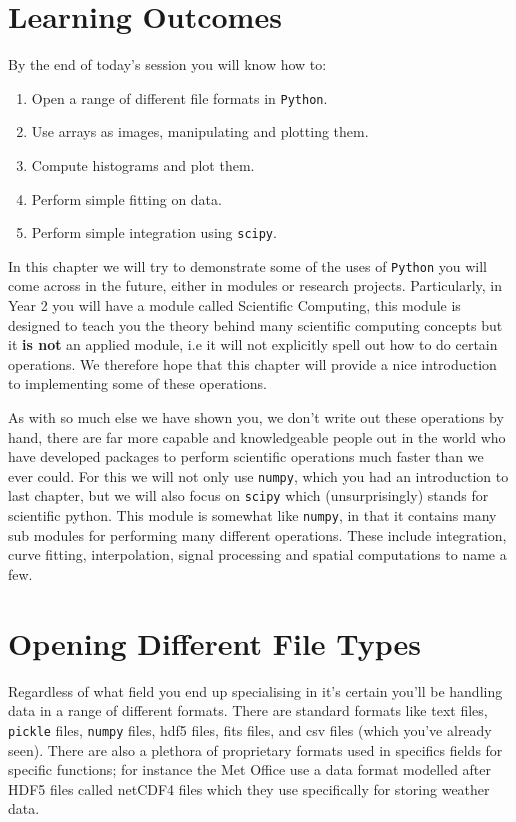 \section{Learning Outcomes}

\noindent By the end of today's session you will know how to:
\begin{enumerate} 
\item Open a range of different file formats in \texttt{Python}.
\item Use arrays as images, manipulating and plotting them.
\item Compute histograms and plot them.
\item Perform simple fitting on data.
\item Perform simple integration using \texttt{scipy}.
\end{enumerate}

In this chapter we will try to demonstrate some of the uses of \texttt{Python} you will come across in the future, either in modules or research projects. Particularly, in Year 2 you will have a module called Scientific Computing, this module is designed to teach you the theory behind many scientific computing concepts but it \textbf{is not} an applied module, i.e it will not explicitly spell out how to do certain operations. We therefore hope that this chapter will provide a nice introduction to implementing some of these operations. 

As with so much else we have shown you, we don't write out these operations by hand, there are far more capable and knowledgeable people out in the world who have developed packages to perform scientific operations much faster than we ever could. For this we will not only use \texttt{numpy}, which you had an introduction to last chapter, but we will also focus on \texttt{scipy} which (unsurprisingly) stands for scientific python. This module is somewhat like \texttt{numpy}, in that it contains many sub modules for performing many different operations. These include integration, curve fitting, interpolation, signal processing and spatial computations to name a few.

\section{Opening Different File Types}

Regardless of what field you end up specialising in it's certain you'll be handling data in a range of different formats. There are standard formats like text files, \texttt{pickle} files, \texttt{numpy} files, hdf5 files, fits files, and csv files (which you've already seen). There are also a plethora of proprietary formats used in specifics fields for specific functions; for instance the Met Office use a data format modelled after HDF5 files called netCDF4 files which they use specifically for storing weather data.

